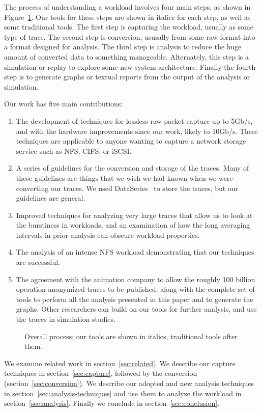 The process of understanding a workload involves four main
steps, as shown in Figure~\ref{fig:overall-process}.  Our tools for
these steps are shown in italics for each step, as well as some
traditional tools.  The first step is capturing the workload, usually
as some type of trace.  The second step is conversion, ususally from
some raw format into a format designed for analysis.  The third step
is analysis to reduce the huge amount of converted data to
something manageable.  Alternately, this step is a simulation or replay to
explore some new system architecture.  Finally the fourth step is to
generate graphs or textual reports from the output of the analysis or
simulation.

Our work has five main contributions:

\begin{enumerate}
\item The development of techniques for lossless raw packet capture up to
5Gb/s, and with the hardware improvements since our work, likely to
10Gb/s.  These techniques are applicable to anyone wanting to capture
a network storage service such as NFS, CIFS, or iSCSI.

\item A series of guidelines for the conversion and storage of the
traces.  Many of these guidelines are things that we wish we had known
when we were converting our traces.  We used
DataSeries~\cite{DataSeriesOSR2009} to store the traces, but our
guidelines are general.

\item Improved techniques for analyzing very large traces that allow
us to look at the burstiness in workloads, and an examination of how
the long averaging intervals in prior analysis can obscure workload
properties.

\item The analysis of an intense NFS workload demonstrating that our
techniques are successful.

\item The agreement with the animation company to allow the roughly
100 billion operation anonymized traces to be published, along with
the complete set of tools to perform all the analysis presented in
this paper and to generate the graphs.  Other
researchers can build on our tools for further analysis, and use
the traces in simulation studies.
\end{enumerate}

\begin{figure}
\center {}
\caption{Overall process; our tools are shown in italics, traditional tools
after them.}
\label{fig:overall-process}
\end{figure}

We examine related work in section~\ref{sec:related}.  We describe our
capture techniques in section~\ref{sec:capture}, followed by the
conversion (section~\ref{sec:conversion}). We describe our adopted and
new analysis techniques in section~\ref{sec:analysis-techniques} and
use them to analyze the workload in section~\ref{sec:analysis}.
Finally we conclude in section~\ref{sec:conclusion}.
